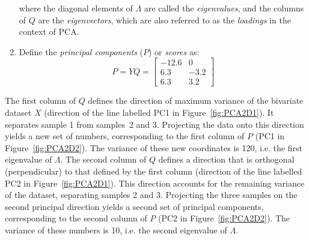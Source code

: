 \begin{enumerate}
  where the diagonal elements of $\Lambda$ are called the
  \emph{eigenvalues}, and the columns of $Q$ are the
  \emph{eigenvectors}, which are also referred to as the
  \emph{loadings} in the context of PCA.

\item Define the \emph{principal components} ($P$) or \emph{scores}
  as:
  \begin{equation}
    P = Y Q = 
    \left[
      \begin{array}{cc}
        -12.6 &  0 \\
          6.3 & -3.2 \\
          6.3 &  3.2
      \end{array}
      \right]
    \label{eq:P}
  \end{equation}

\end{enumerate}

The first column of $Q$ defines the direction of maximum variance of
the bivariate dataset $X$ (direction of the line labelled PC1 in
Figure~\ref{fig:PCA2D1}).  It separates sample 1 from samples~2 and
3. Projecting the data onto this direction yields a new set of
numbers, corresponding to the first column of $P$ (PC1 in
Figure~\ref{fig:PCA2D2}). The variance of these new coordinates is
120, i.e. the first eigenvalue of $\Lambda$. The second column of $Q$
defines a direction that is orthogonal (perpendicular) to that defined
by the first column (direction of the line labelled PC2 in
Figure~\ref{fig:PCA2D1}). This direction accounts for the remaining
variance of the dataset, separating samples 2 and 3. Projecting the
three samples on the second principal direction yields a second set of
principal components, corresponding to the second column of $P$ (PC2
in Figure~\ref{fig:PCA2D2}). The variance of these numbers is 10,
i.e. the second eigenvalue of $\Lambda$.

